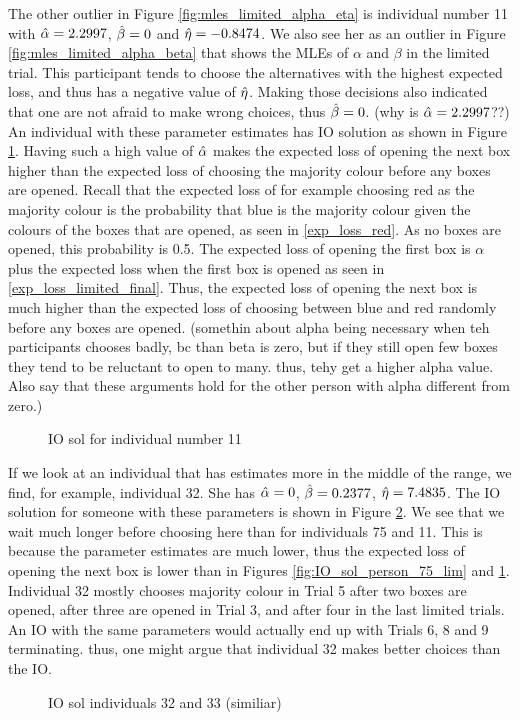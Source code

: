 The other outlier in Figure \ref{fig:mles_limited_alpha_eta} is individual number 11 with $\hat{\alpha}=2.2997$, $\hat{\beta}=0$ and $\hat{\eta}=-0.8474$. We also see her as an outlier in Figure \ref{fig:mles_limited_alpha_beta} that shows the MLEs of $\alpha$ and $\beta$ in the limited trial. This participant tends to choose the alternatives with the highest expected loss, and thus has a negative value of $\hat{\eta}$. Making those decisions also indicated that one are not afraid to make wrong choices, thus $\hat{\beta}=0$. (why is $\hat{\alpha}=2.2997$??) An individual with these parameter estimates has IO solution as shown in Figure \ref{fig:IO_sol_person_11_lim}. Having such a high value of $\hat{\alpha}$ makes the expected loss of opening the next box higher than the expected loss of choosing the majority colour before any boxes are opened. Recall that the expected loss of for example choosing red as the majority colour is the probability that blue is the majority colour given the colours of the boxes that are opened, as seen in \eqref{exp_loss_red}. As no boxes are opened, this probability is 0.5. The expected loss of opening the first box is $\alpha$ plus the expected loss when the first box is opened as seen in \eqref{exp_loss_limited_final}. Thus, the expected loss of opening the next box is much higher than the expected loss of choosing between blue and red randomly before any boxes are opened. (somethin about alpha being necessary when teh participants chooses badly, bc than beta is zero, but if they still open few boxes they tend to be reluctant to open to many. thus, tehy get a higher alpha value. Also say that these arguments hold for the other person with alpha different from zero.)
\begin{figure}
    \centering
    \scalebox{0.8}{}
    \caption[IO solution for individual number 11, limited]{IO sol for individual number 11}
    \label{fig:IO_sol_person_11_lim}
\end{figure}




If we look at an individual that has estimates more in the middle of the range, we find, for example, individual 32. She has  $\hat{\alpha}=0$, $\hat{\beta}=0.2377$, $\hat{\eta}=7.4835$. The IO solution for someone with these parameters is shown in Figure \ref{fig:IO_sol_lim_person32and33}. We see that we wait much longer before choosing here than for individuals 75 and 11. This is because the parameter estimates are much lower, thus the expected loss of opening the next box is lower than in Figures \ref{fig:IO_sol_person_75_lim} and \ref{fig:IO_sol_person_11_lim}.
Individual 32 mostly chooses majority colour in Trial 5 after two boxes are opened, after three are opened in Trial 3, and after four in the last limited trials. An IO with the same parameters would actually end up with Trials 6, 8 and 9 terminating. thus, one might argue that individual 32 makes better choices than the IO. 
\begin{figure}
    \centering
    \scalebox{0.7}{}
    \caption{IO sol individuals 32 and 33 (similiar)}
    \label{fig:IO_sol_lim_person32and33}
\end{figure}


